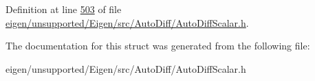 Definition at line \hyperlink{eigen_2unsupported_2_eigen_2src_2_auto_diff_2_auto_diff_scalar_8h_source_l00503}{503} of file \hyperlink{eigen_2unsupported_2_eigen_2src_2_auto_diff_2_auto_diff_scalar_8h_source}{eigen/unsupported/\+Eigen/src/\+Auto\+Diff/\+Auto\+Diff\+Scalar.\+h}.



The documentation for this struct was generated from the following file\+:\begin{DoxyCompactItemize}
\item 
eigen/unsupported/\+Eigen/src/\+Auto\+Diff/\+Auto\+Diff\+Scalar.\+h\end{DoxyCompactItemize}
